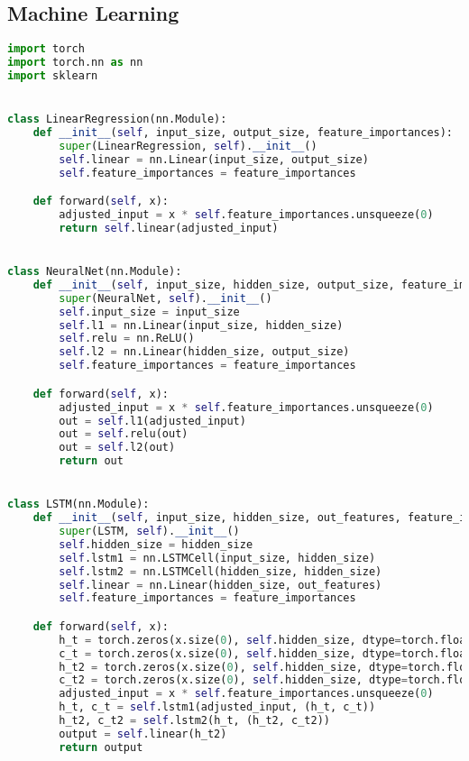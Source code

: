 \subsection{Machine Learning}
\label{subsec:code_ml}

\begin{lstlisting}[language=Python,label={lst:ml.py}, basicstyle=\scriptsize]
import torch
import torch.nn as nn
import sklearn


class LinearRegression(nn.Module):
    def __init__(self, input_size, output_size, feature_importances):
        super(LinearRegression, self).__init__()
        self.linear = nn.Linear(input_size, output_size)
        self.feature_importances = feature_importances

    def forward(self, x):
        adjusted_input = x * self.feature_importances.unsqueeze(0)
        return self.linear(adjusted_input)


class NeuralNet(nn.Module):
    def __init__(self, input_size, hidden_size, output_size, feature_importances):
        super(NeuralNet, self).__init__()
        self.input_size = input_size
        self.l1 = nn.Linear(input_size, hidden_size)
        self.relu = nn.ReLU()
        self.l2 = nn.Linear(hidden_size, output_size)
        self.feature_importances = feature_importances

    def forward(self, x):
        adjusted_input = x * self.feature_importances.unsqueeze(0)
        out = self.l1(adjusted_input)
        out = self.relu(out)
        out = self.l2(out)
        return out


class LSTM(nn.Module):
    def __init__(self, input_size, hidden_size, out_features, feature_importances):
        super(LSTM, self).__init__()
        self.hidden_size = hidden_size
        self.lstm1 = nn.LSTMCell(input_size, hidden_size)
        self.lstm2 = nn.LSTMCell(hidden_size, hidden_size)
        self.linear = nn.Linear(hidden_size, out_features)
        self.feature_importances = feature_importances

    def forward(self, x):
        h_t = torch.zeros(x.size(0), self.hidden_size, dtype=torch.float32)
        c_t = torch.zeros(x.size(0), self.hidden_size, dtype=torch.float32)
        h_t2 = torch.zeros(x.size(0), self.hidden_size, dtype=torch.float32)
        c_t2 = torch.zeros(x.size(0), self.hidden_size, dtype=torch.float32)
        adjusted_input = x * self.feature_importances.unsqueeze(0)
        h_t, c_t = self.lstm1(adjusted_input, (h_t, c_t))
        h_t2, c_t2 = self.lstm2(h_t, (h_t2, c_t2))
        output = self.linear(h_t2)
        return output



\end{lstlisting}
